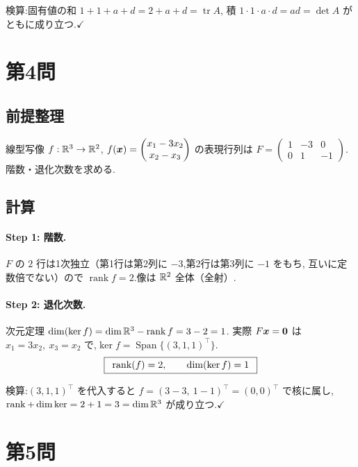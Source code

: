 \documentclass[11pt,a4paper]{article}
\begin{document}
検算:固有値の和 $1+1+a+d=2+a+d=\operatorname{tr}A$,
積 $1\cdot1\cdot a\cdot d=ad=\det A$ がともに成り立つ.$\checkmark$

\section*{第4問}

\subsection*{前提整理}

線型写像 $f:\mathbb{R}^3\to\mathbb{R}^2$,
$f(\bm{x})=\begin{pmatrix}x_1-3x_2\\x_2-x_3\end{pmatrix}$
の表現行列は
$F=\begin{pmatrix}1&-3&0\\0&1&-1\end{pmatrix}$.
階数・退化次数を求める.

\subsection*{計算}

\paragraph{Step 1: 階数.}
$F$ の $2$ 行は1次独立（第1行は第2列に $-3$,第2行は第3列に $-1$ をもち,
互いに定数倍でない）ので $\operatorname{rank}f=2$.像は $\mathbb{R}^2$ 全体（全射）.

\paragraph{Step 2: 退化次数.}
次元定理 $\dim(\ker f)=\dim\mathbb{R}^3-\operatorname{rank}f=3-2=1$.
実際 $F\bm{x}=\bm{0}$ は $x_1=3x_2,\ x_3=x_2$ で,$\ker f=\operatorname{Span}\{(3,1,1)^\top\}$.
\[
\boxed{\,\ \operatorname{rank}(f)=2,\qquad \dim(\ker f)=1\ \,}
\]

検算:$(3,1,1)^\top$ を代入すると $f=(3-3,\ 1-1)^\top=(0,0)^\top$ で核に属し,
$\operatorname{rank}+\dim\ker=2+1=3=\dim\mathbb{R}^3$ が成り立つ.$\checkmark$

\section*{第5問}
\end{document}
